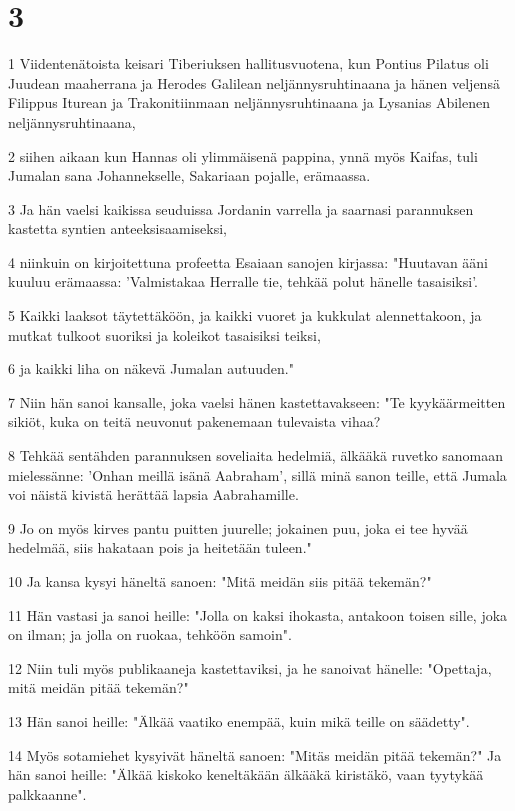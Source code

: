 \chapter{3}

\par 1 Viidentenätoista keisari Tiberiuksen hallitusvuotena, kun Pontius Pilatus oli Juudean maaherrana ja Herodes Galilean neljännysruhtinaana ja hänen veljensä Filippus Iturean ja Trakonitiinmaan neljännysruhtinaana ja Lysanias Abilenen neljännysruhtinaana,
\par 2 siihen aikaan kun Hannas oli ylimmäisenä pappina, ynnä myös Kaifas, tuli Jumalan sana Johannekselle, Sakariaan pojalle, erämaassa.
\par 3 Ja hän vaelsi kaikissa seuduissa Jordanin varrella ja saarnasi parannuksen kastetta syntien anteeksisaamiseksi,
\par 4 niinkuin on kirjoitettuna profeetta Esaiaan sanojen kirjassa: "Huutavan ääni kuuluu erämaassa: 'Valmistakaa Herralle tie, tehkää polut hänelle tasaisiksi'.
\par 5 Kaikki laaksot täytettäköön, ja kaikki vuoret ja kukkulat alennettakoon, ja mutkat tulkoot suoriksi ja koleikot tasaisiksi teiksi,
\par 6 ja kaikki liha on näkevä Jumalan autuuden."
\par 7 Niin hän sanoi kansalle, joka vaelsi hänen kastettavakseen: "Te kyykäärmeitten sikiöt, kuka on teitä neuvonut pakenemaan tulevaista vihaa?
\par 8 Tehkää sentähden parannuksen soveliaita hedelmiä, älkääkä ruvetko sanomaan mielessänne: 'Onhan meillä isänä Aabraham', sillä minä sanon teille, että Jumala voi näistä kivistä herättää lapsia Aabrahamille.
\par 9 Jo on myös kirves pantu puitten juurelle; jokainen puu, joka ei tee hyvää hedelmää, siis hakataan pois ja heitetään tuleen."
\par 10 Ja kansa kysyi häneltä sanoen: "Mitä meidän siis pitää tekemän?"
\par 11 Hän vastasi ja sanoi heille: "Jolla on kaksi ihokasta, antakoon toisen sille, joka on ilman; ja jolla on ruokaa, tehköön samoin".
\par 12 Niin tuli myös publikaaneja kastettaviksi, ja he sanoivat hänelle: "Opettaja, mitä meidän pitää tekemän?"
\par 13 Hän sanoi heille: "Älkää vaatiko enempää, kuin mikä teille on säädetty".
\par 14 Myös sotamiehet kysyivät häneltä sanoen: "Mitäs meidän pitää tekemän?" Ja hän sanoi heille: "Älkää kiskoko keneltäkään älkääkä kiristäkö, vaan tyytykää palkkaanne".
